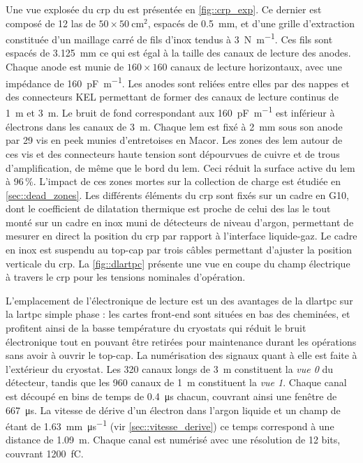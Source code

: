       Une vue explosée du \gls{crp} du \TOO{} est présentée en \autoref{fig::crp_exp}. Ce dernier est composé de 12 \gls{las} de $50\times\SI{50}{\centi\meter\squared}$,  espacés de \SI{0.5}{\milli\meter}, et d'une grille d'extraction constituée d'un maillage carré de fils d'inox tendus à \SI{3}{\newton\per\meter}. Ces fils sont espacés de \SI{3.125}{\milli\meter} ce qui est égal à la taille des canaux de lecture des anodes. Chaque anode est munie de $160\times160$ canaux de lecture horizontaux, avec une impédance de \SI{160}{\pico\farad\per\meter}. Les anodes sont reliées entre elles par des nappes et des connecteurs KEL permettant de former des canaux de lecture continus de \SI{1}{\meter} et \SI{3}{\meter}. Le bruit de fond correspondant aux \SI{160}{\pico\farad\per\meter} est inférieur à  électrons dans les canaux de \SI{3}{\meter}\cite{Aimard2018}. Chaque \gls{lem} est fixé à \SI{2}{\milli\meter} sous son anode par 29 vis en \gls{peek} munies d'entretoises en Macor. Les zones des \gls{lem} autour de ces vis et des connecteurs haute tension sont dépourvues de cuivre et de trous d'amplification, de même que le bord du \gls{lem}. Ceci réduit la surface active du \gls{lem} à 96\,\%. L'impact de ces zones mortes sur la collection de charge est étudiée en \autoref{sec::dead_zones}. Les différents éléments du \gls{crp} sont fixés sur un cadre en G10, dont le coefficient de dilatation thermique est proche de celui des \gls{las} le tout monté sur un cadre en inox muni de détecteurs de niveau d'argon, permettant de mesurer en direct la position du \gls{crp} par rapport à l'interface liquide-gaz. Le cadre en inox est suspendu au top-cap par trois câbles permettant d'ajuster la position verticale du \gls{crp}. La \autoref{fig::dlartpc} présente une vue en coupe du champ électrique à travers le \gls{crp} pour les tensions nominales d'opération.

      L'emplacement de l'électronique de lecture est un des avantages de la \gls{dlartpc} sur la \gls{lartpc} simple phase : les cartes front-end sont situées en bas des cheminées, et profitent ainsi de la basse température du cryostats qui réduit le bruit électronique tout en pouvant être retirées pour maintenance durant les opérations sans avoir à ouvrir le top-cap. La numérisation des signaux quant à elle est faite à l'extérieur du cryostat. Les 320 canaux longs de \SI{3}{\meter} constituent la \textit{vue 0} du détecteur, tandis que les 960 canaux de \SI{1}{\meter} constituent la \textit{vue 1}. Chaque canal est découpé en  bins de temps de \SI{0.4}{\micro\second} chacun, couvrant ainsi une fenêtre de \SI{667}{\micro\second}. La vitesse de dérive d'un électron dans l'argon liquide et un champ de \driftfield{} étant de \SI{1.63}{\milli\meter\per\micro\second} (vir \autoref{sec::vitesse_derive}) ce temps correspond à une distance de \SI{1.09}{\meter}. Chaque canal est numérisé avec une résolution de 12 bits, couvrant \SI{1200}{\femto\coulomb}.

